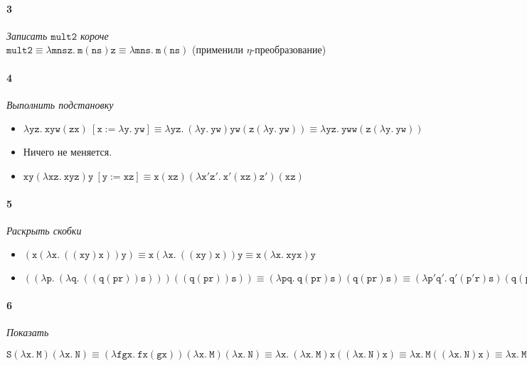 \documentclass[russian]{article}
\begin{document}
\paragraph{3} \textit{Записать $\mathtt{mult2}$ короче}
\\

$\mathtt{mult2 \equiv \lambda mnsz.\ m(ns)z	\equiv \lambda mns.\ m(ns)}$ (применили $\eta$-преобразование)

\paragraph{4} \textit{Выполнить подстановку}

\begin{itemize}
\item $\mathtt{\lambda yz.\ xyw(zx)\ [x := \lambda y.\ yw]
	\equiv \lambda yz.\ (\lambda y.\ yw)yw(z(\lambda y.\ yw))
	\equiv \lambda yz.\ yww(z(\lambda y.\ yw)) }$

\item Ничего не меняется.

\item $\mathtt{xy(\lambda xz.\ xyz)y\ [y := xz]
	\equiv x(xz)(\lambda x'z'.\ x'(xz)z')(xz) }$

\end{itemize}

\paragraph{5} \textit{Раскрыть скобки}

\begin{itemize}
\item $\mathtt{
	(x(\lambda x.\ ((xy)x))y) \equiv
	x(\lambda x.\ ((xy)x))y \equiv
	x(\lambda x.\ xyx)y
	}$

\item $\mathtt{
	((\lambda p.\ (\lambda q.\ ((q (p r)) s))) ((q (p r)) s)) \equiv
	(\lambda pq.\ q (pr) s) (q (p r) s) \equiv
	(\lambda p'q'.\ q' (p'r) s) (q (p r) s) \equiv
	\lambda q'.\ q' (q (pr) sr) s
	}$
\end{itemize}

\paragraph{6} \textit{Показать}

$\mathtt{
	S(\lambda x.\ M)(\lambda x.\ N) \equiv
	(\lambda fgx.\ fx(gx))(\lambda x.\ M)(\lambda x.\ N) \equiv
	\lambda x.\ (\lambda x.\ M)x((\lambda x.\ N)x) \equiv
	\lambda x.\ M((\lambda x.\ N)x) \equiv
	\lambda x.\ MN}$
	
\end{document}
